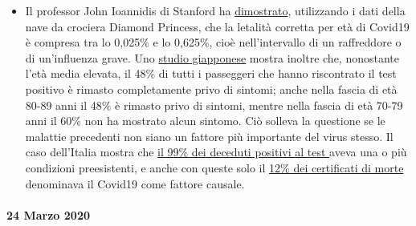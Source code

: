 \begin{itemize}
\item
  Il professor John Ioannidis di Stanford ha
  \href{https://www.statnews.com/2020/03/17/a-fiasco-in-the-making-as-the-coronavirus-pandemic-takes-hold-we-are-making-decisions-without-reliable-data/}{dimostrato},
  utilizzando i dati della nave da crociera Diamond Princess, che la
  letalità corretta per età di Covid19 è compresa tra lo 0,025\% e lo
  0,625\%, cioè nell'intervallo di un raffreddore o di un'influenza
  grave. Uno
  \href{https://www.niid.go.jp/niid/en/2019-ncov-e/9407-covid-dp-fe-01.html}{studio
  giapponese} mostra inoltre che, nonostante l'età media elevata, il
  48\% di tutti i passeggeri che hanno riscontrato il test positivo è
  rimasto completamente privo di sintomi; anche nella fascia di età
  80-89 anni il 48\% è rimasto privo di sintomi, mentre nella fascia di
  età 70-79 anni il 60\% non ha mostrato alcun sintomo. Ciò solleva la
  questione se le malattie precedenti non siano un fattore più
  importante del virus stesso. Il caso dell'Italia mostra che
  \href{https://www.bloomberg.com/news/articles/2020-03-18/99-of-those-who-died-from-virus-had-other-illness-italy-says}{il
  99\% dei deceduti positivi al test }aveva una o più condizioni
  preesistenti, e anche con queste solo il
  \href{https://web.archive.org/web/20200324214448/https://www.telegraph.co.uk/global-health/science-and-disease/have-many-coronavirus-patients-died-italy/}{12\%
  dei certificati di morte} denominava il Covid19 come fattore causale.
\end{itemize}

\hypertarget{24-marzo-2020}{%
\paragraph{24 Marzo 2020}\label{24-marzo-2020}}

